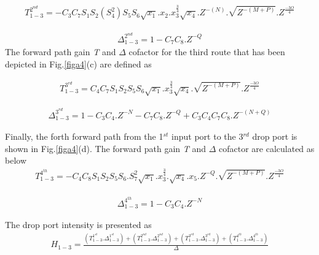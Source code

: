 \documentclass{osa-article}
\begin{document}
\begin{equation}
\begin{split}
T^{2^{nd}}_{1-3}=-C_3C_7S_1S_2(S^2_4)S_5S_6\sqrt{x_1}.x_{2}.{x^{\frac{3}{4}}_3}\sqrt{x_4}.Z^{-(N)}.\sqrt{Z^{-(M+P)}}.Z^{\frac{-3O}{4}}
\end{split}
\end{equation}

\begin{equation}
\begin{split}
\Delta^{2^{nd}}_{1-3}=1-C_7C_8.Z^{-Q}
\end{split}
\end{equation}
The forward path gain \textit {T} and $\Delta$ cofactor for the third route that has been depicted in Fig.\ref{figa4}(c) are defined as

\begin{equation}
\begin{split}
T^{3^{rd}}_{1-3}=C_4C_7S_1S_2S_5S_6\sqrt{x_1}.{x^{\frac{3}{4}}_3}\sqrt{x_4}.\sqrt{Z^{-(M+P)}}.Z^{\frac{-3O}{4}}
\end{split}
\end{equation}

\begin{equation}
\begin{split}
\Delta^{3^{rd}}_{1-3}=1-C_3C_4.Z^{-N}-C_7C_8.Z^{-Q}+C_3C_4C_7C_8.Z^{-(N+Q)}
\end{split}
\end{equation}

Finally, the forth forward path from the 1$^{st}$ input port to the 3$^{rd}$ drop port is shown in Fig.\ref{figa4}(d). The forward path gain \textit {T} and $\Delta$ cofactor are calculated as below
\begin{equation}
\begin{split}
T^{4^{th}}_{1-3}=-C_4C_8S_1S_2S_5S_6.S^2_7\sqrt{x_1}.{x^{\frac{3}{4}}_3}.\sqrt{x_4}.x_5.Z^{-Q}.\sqrt{Z^{-(M+P)}}.Z^{\frac{-3O}{4}}
\end{split}
\end{equation}

\begin{equation}
\begin{split}
\Delta^{4^{th}}_{1-3}=1-C_3C_4.Z^{-N}
\end{split}
\end{equation}

The drop port intensity is presented as
\begin{equation}
\begin{split}
H_{1-3}=\frac{(T^{1^{st}}_{1-3}.\Delta^{1^{st}}_{1-3})+(T^{2^{nd}}_{1-3}.\Delta^{2^{nd}}_{1-3})+(T^{3^{rd}}_{1-3}.\Delta^{3^{rd}}_{1-3})+(T^{4^{th}}_{1-3}.\Delta^{4^{th}}_{1-3})}{\Delta}
\end{split}
\end{equation}
\end{document}
